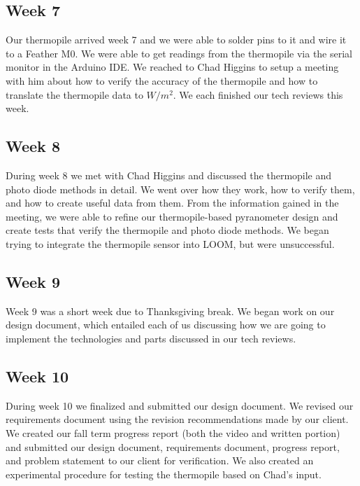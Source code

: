 \documentclass[10pt,draftclsnofoot,onecolumn,letterpaper]{article}
\begin{document}
\subsection{Week 7}
Our thermopile arrived week 7 and we were able to solder pins to it and wire it to a Feather M0. We were able to get readings from the thermopile via the serial monitor in the Arduino IDE. We reached to Chad Higgins to setup a meeting with him about how to verify the accuracy of the thermopile and how to translate the thermopile data to $W/m^2$. We each finished our tech reviews this week.
\subsection{Week 8}
During week 8 we met with Chad Higgins and discussed the thermopile and photo diode methods in detail. We went over how they work, how to verify them, and how to create useful data from them. From the information gained in the meeting, we were able to refine our thermopile-based pyranometer design and create tests that verify the thermopile and photo diode methods. We began trying to integrate the thermopile sensor into LOOM, but were unsuccessful. 
\subsection{Week 9}
Week 9 was a short week due to Thanksgiving break. We began work on our design document, which entailed each of us discussing how we are going to implement the technologies and parts discussed in our tech reviews. 
\subsection{Week 10}
During week 10 we finalized and submitted our design document. We revised our requirements document using the revision recommendations made by our client. We created our fall term progress report (both the video and written portion) and submitted our design document, requirements document, progress report, and problem statement to our client for verification. We also created an experimental procedure for testing the thermopile based on Chad's input.
\end{document}
